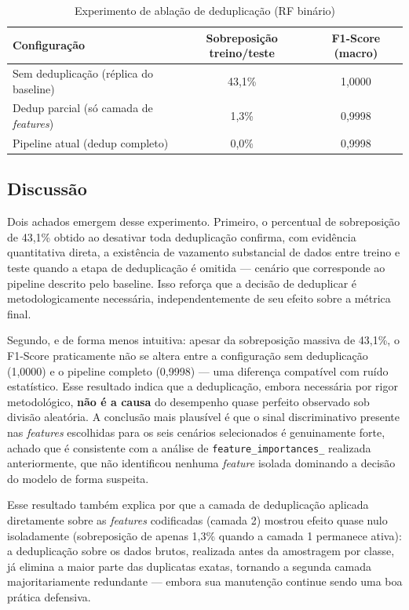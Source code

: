 \begin{table}[htbp]
\centering
\caption{Experimento de ablação de deduplicação (RF binário)}
\label{tab:ablacao-dedup}
\begin{tabular}{@{}lcc@{}}
\toprule
\textbf{Configuração} & \textbf{Sobreposição treino/teste} & \textbf{F1-Score (macro)} \\
\midrule
Sem deduplicação (réplica do baseline) & 43{,}1\% & 1{,}0000 \\
Dedup parcial (só camada de \textit{features}) & 1{,}3\% & 0{,}9998 \\
Pipeline atual (dedup completo) & 0{,}0\% & 0{,}9998 \\
\bottomrule
\end{tabular}
\end{table}

\subsection{Discussão}

Dois achados emergem desse experimento. Primeiro, o percentual de sobreposição de 43,1\% obtido ao desativar toda deduplicação confirma, com evidência quantitativa direta, a existência de vazamento substancial de dados entre treino e teste quando a etapa de deduplicação é omitida — cenário que corresponde ao pipeline descrito pelo baseline. Isso reforça que a decisão de deduplicar é metodologicamente necessária, independentemente de seu efeito sobre a métrica final.

Segundo, e de forma menos intuitiva: apesar da sobreposição massiva de 43,1\%, o F1-Score praticamente não se altera entre a configuração sem deduplicação (1{,}0000) e o pipeline completo (0{,}9998) — uma diferença compatível com ruído estatístico. Esse resultado indica que a deduplicação, embora necessária por rigor metodológico, \textbf{não é a causa} do desempenho quase perfeito observado sob divisão aleatória. A conclusão mais plausível é que o sinal discriminativo presente nas \textit{features} escolhidas para os seis cenários selecionados é genuinamente forte, achado que é consistente com a análise de \texttt{feature\_importances\_} realizada anteriormente, que não identificou nenhuma \textit{feature} isolada dominando a decisão do modelo de forma suspeita.

Esse resultado também explica por que a camada de deduplicação aplicada diretamente sobre as \textit{features} codificadas (camada 2) mostrou efeito quase nulo isoladamente (sobreposição de apenas 1,3\% quando a camada 1 permanece ativa): a deduplicação sobre os dados brutos, realizada antes da amostragem por classe, já elimina a maior parte das duplicatas exatas, tornando a segunda camada majoritariamente redundante — embora sua manutenção continue sendo uma boa prática defensiva.

